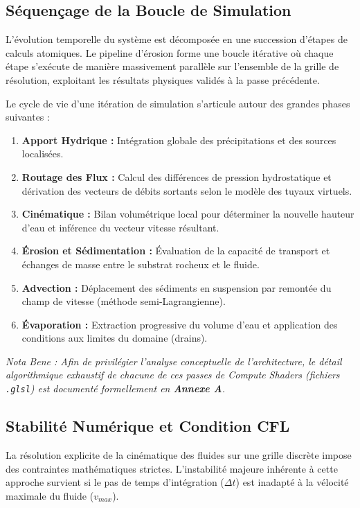 \documentclass[10pt,twocolumn,a4paper]{article}
\begin{document}
\subsection{Séquençage de la Boucle de Simulation}\label{subsec:boucle_simu}
L'évolution temporelle du système est décomposée en une succession d'étapes de calculs atomiques. Le pipeline d'érosion forme une boucle itérative où chaque étape s'exécute de manière massivement parallèle sur l'ensemble de la grille de résolution, exploitant les résultats physiques validés à la passe précédente.

Le cycle de vie d'une itération de simulation s'articule autour des grandes phases suivantes :
\begin{enumerate}
    \item \textbf{Apport Hydrique :} Intégration globale des précipitations et des sources localisées.
    \item \textbf{Routage des Flux :} Calcul des différences de pression hydrostatique et dérivation des vecteurs de débits sortants selon le modèle des tuyaux virtuels.
    \item \textbf{Cinématique :} Bilan volumétrique local pour déterminer la nouvelle hauteur d'eau et inférence du vecteur vitesse résultant.
    \item \textbf{Érosion et Sédimentation :} Évaluation de la capacité de transport et échanges de masse entre le substrat rocheux et le fluide.
    \item \textbf{Advection :} Déplacement des sédiments en suspension par remontée du champ de vitesse (méthode semi-Lagrangienne).
    \item \textbf{Évaporation :} Extraction progressive du volume d'eau et application des conditions aux limites du domaine (drains).
\end{enumerate}

\textit{Nota Bene : Afin de privilégier l'analyse conceptuelle de l'architecture, le détail algorithmique exhaustif de chacune de ces passes de Compute Shaders (fichiers \texttt{.glsl}) est documenté formellement en \textbf{Annexe A}.}

\subsection{Stabilité Numérique et Condition CFL}\label{subsec:cfl}
La résolution explicite de la cinématique des fluides sur une grille discrète impose des contraintes mathématiques strictes. L'instabilité majeure inhérente à cette approche survient si le pas de temps d'intégration ($\Delta t$) est inadapté à la vélocité maximale du fluide ($v_{max}$).
\end{document}
